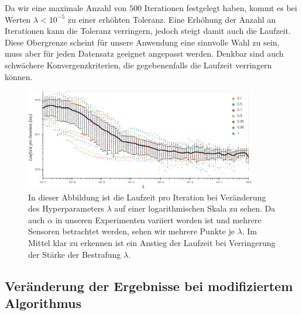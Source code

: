 Da wir eine maximale Anzahl von $500$ Iterationen festgelegt haben, kommt es bei Werten $\lambda < 10^{-5}$ zu einer erhöhten Toleranz. Eine Erhöhung der Anzahl an Iterationen kann die Toleranz verringern, jedoch steigt damit auch die Laufzeit. Diese Obergrenze scheint für unsere Anwendung eine sinnvolle Wahl zu sein, muss aber für jeden Datensatz geeignet angepasst werden. Denkbar sind auch schwächere Konvergenzkriterien, die gegebenenfalls die Laufzeit verringern können.

\begin{figure}
\centering
\includegraphics[width = 0.9\textwidth]{figures/run_time_per_iteration.jpg}
\caption{In dieser Abbildung ist die Laufzeit pro Iteration bei Veränderung des Hyperparameters $\lambda$ auf einer logarithmischen Skala zu sehen. Da auch $\alpha$ in unseren Experimenten variiert worden ist und mehrere Sensoren betrachtet werden, sehen wir mehrere Punkte je $\lambda$. Im Mittel klar zu erkennen ist ein Anstieg der Laufzeit bei Verringerung der Stärke der Bestrafung $\lambda$.}
\label{run_time_per_iteration}
\end{figure}




\subsection{Veränderung der Ergebnisse bei modifiziertem Algorithmus}
\label{comparison_special_case}

